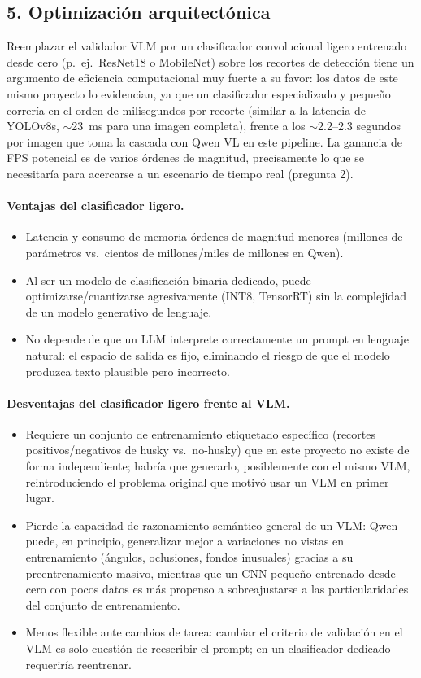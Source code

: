 \documentclass[11pt]{article}
\begin{document}
\subsection*{5. Optimización arquitectónica}

Reemplazar el validador VLM por un clasificador convolucional ligero entrenado desde cero (p.\
ej.\ ResNet18 o MobileNet) sobre los recortes de detección tiene un argumento de eficiencia
computacional muy fuerte a su favor: los datos de este mismo proyecto lo evidencian, ya que un
clasificador especializado y pequeño correría en el orden de milisegundos por recorte (similar a
la latencia de YOLOv8s, $\sim$23~ms para una imagen completa), frente a los $\sim$2.2--2.3
segundos por imagen que toma la cascada con Qwen VL en este pipeline. La ganancia de FPS
potencial es de varios órdenes de magnitud, precisamente lo que se necesitaría para acercarse a
un escenario de tiempo real (pregunta 2).

\paragraph{Ventajas del clasificador ligero.}
\begin{itemize}[nosep]
  \item Latencia y consumo de memoria órdenes de magnitud menores (millones de parámetros vs.\
  cientos de millones/miles de millones en Qwen).
  \item Al ser un modelo de clasificación binaria dedicado, puede optimizarse/cuantizarse
  agresivamente (INT8, TensorRT) sin la complejidad de un modelo generativo de lenguaje.
  \item No depende de que un LLM interprete correctamente un prompt en lenguaje natural: el
  espacio de salida es fijo, eliminando el riesgo de que el modelo produzca texto plausible pero
  incorrecto.
\end{itemize}

\paragraph{Desventajas del clasificador ligero frente al VLM.}
\begin{itemize}[nosep]
  \item Requiere un conjunto de entrenamiento etiquetado específico (recortes positivos/negativos
  de husky vs.\ no-husky) que en este proyecto no existe de forma independiente; habría que
  generarlo, posiblemente con el mismo VLM, reintroduciendo el problema original que motivó usar
  un VLM en primer lugar.
  \item Pierde la capacidad de razonamiento semántico general de un VLM: Qwen puede, en
  principio, generalizar mejor a variaciones no vistas en entrenamiento (ángulos, oclusiones,
  fondos inusuales) gracias a su preentrenamiento masivo, mientras que un CNN pequeño entrenado
  desde cero con pocos datos es más propenso a sobreajustarse a las particularidades del
  conjunto de entrenamiento.
  \item Menos flexible ante cambios de tarea: cambiar el criterio de validación en el VLM es
  solo cuestión de reescribir el prompt; en un clasificador dedicado requeriría reentrenar.
\end{itemize}
\end{document}
